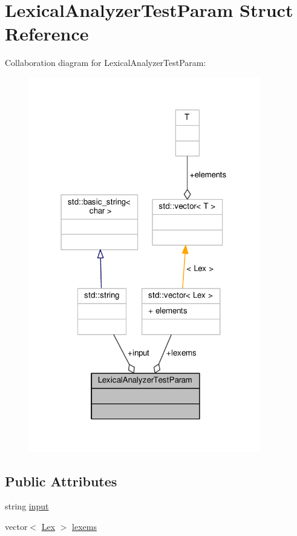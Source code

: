 \hypertarget{struct_lexical_analyzer_test_param}{}\section{Lexical\+Analyzer\+Test\+Param Struct Reference}
\label{struct_lexical_analyzer_test_param}


Collaboration diagram for Lexical\+Analyzer\+Test\+Param\+:
\nopagebreak
\begin{figure}[H]
\begin{center}
\leavevmode
\includegraphics[width=286pt]{struct_lexical_analyzer_test_param__coll__graph}
\end{center}
\end{figure}
\subsection*{Public Attributes}
\begin{DoxyCompactItemize}
\item 
string \hyperlink{struct_lexical_analyzer_test_param_abc163995865fa8efa68a0a4dd53d77ef}{input}
\item 
vector$<$ \hyperlink{classteam22_1_1_calc_1_1_lex}{Lex} $>$ \hyperlink{struct_lexical_analyzer_test_param_a4d683034767e8307cf3bc765e40c93d8}{lexems}
\end{DoxyCompactItemize}
